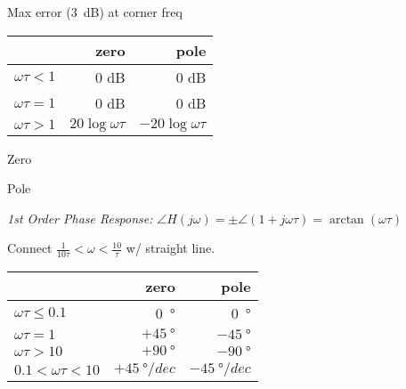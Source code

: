 \documentclass[twocolumn]{article}
\begin{document}
Max error (\SI{3}{dB}) at corner freq

\newpage

\begin{table}[h!]
    \centering
    \begin{tabular}{lrr}
        \toprule
        & zero & pole \\
        \midrule
        $\omega \tau < 1$ & 0 dB & 0 dB \\
        $\omega \tau = 1$ & 0 dB & 0 dB \\
        $\omega \tau > 1$ & $20 \log \omega \tau$ & $-20 \log \omega \tau$ \\
        \bottomrule
    \end{tabular}
\end{table}

\begin{minipage}{0.49\columnwidth}
    \centering \hspace{1em} Zero \\[0.5em]
\end{minipage}
\hfill
\begin{minipage}{0.49\columnwidth}
    \centering \hspace{1em} Pole \\[0.5em]
\end{minipage}

\dotfill

\textit{1st Order Phase Response:} $\angle H(j\omega) = \pm \angle (1 + j \omega \tau) = \arctan(\omega \tau)$

Connect $\frac{1}{10\tau} < \omega < \frac{10}{\tau}$ w/ straight line.

\begin{table}[h!]
    \centering
    \begin{tabular}{lrr}
        \toprule
        & zero & pole \\
        \midrule
        $\omega \tau \leq 0.1$ & \SI{0}{\degree} & \SI{0}{\degree} \\
        $\omega \tau = 1$ & $+\SI{45}{\degree}$ & $-\SI{45}{\degree}$  \\
        $\omega \tau > 10$ & $+\SI{90}{\degree}$ & $-\SI{90}{\degree}$ \\
        $0.1 < \omega \tau < 10$ & $+\SI{45}{\degree/dec}$ & $-\SI{45}{\degree/dec}$ \\
        \bottomrule
    \end{tabular}
\end{table} \vspace{-.5em}
\end{document}
